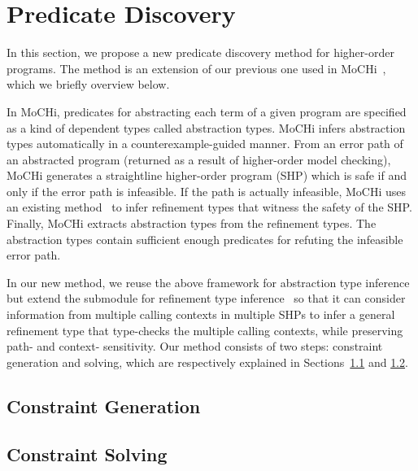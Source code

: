 \section{Predicate Discovery}

In this section, we propose a new predicate discovery method for 
higher-order programs.  The method is an extension of our previous one 
used in MoCHi~\cite{KobayashiPLDI2011}, which we briefly overview below.

In MoCHi, predicates for abstracting each term of a given program are 
specified as a kind of dependent types called abstraction types.  MoCHi 
infers abstraction types automatically in a counterexample-guided manner. 
 From an error path of an abstracted program (returned as a result of 
higher-order model checking), MoCHi generates a straightline 
higher-order program (SHP) which is safe if and only if the error path 
is infeasible.  If the path is actually infeasible, MoCHi uses an 
existing method~\cite{Unno2009} to infer refinement types that witness 
the safety of the SHP.  Finally, MoCHi extracts abstraction types from 
the refinement types.  The abstraction types contain sufficient enough 
predicates for refuting the infeasible error path.

In our new method, we reuse the above framework for abstraction type 
inference but extend the submodule for refinement type 
inference~\cite{Unno2009} so that it can consider information from 
multiple calling contexts in multiple SHPs to infer a general refinement 
type that type-checks the multiple calling contexts, while preserving 
path- and context- sensitivity.  Our method consists of two steps: 
constraint generation and solving, which are respectively explained in 
Sections~\ref{sec:cg} and \ref{sec:cs}.

\subsection{Constraint Generation}
\label{sec:cg}

\subsection{Constraint Solving}
\label{sec:cs}
